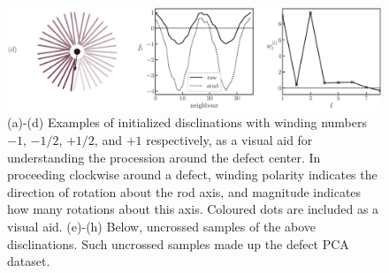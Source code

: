 \begin{figure}[!t]
\begin{minipage}[c]{\columnwidth}
		\includegraphics[width=\columnwidth]{./figs/prob_stats_plusone_small_0.eps}
	\end{minipage}%
	\caption{(a)-(d) Examples of initialized disclinations with winding numbers $-1$, $-1/2$, $+1/2$, and $+1$ respectively, as a visual aid for understanding the procession around the defect center. In proceeding clockwise around a defect, winding polarity indicates the direction of rotation about the rod axis, and magnitude indicates how many rotations about this axis. Coloured dots are included as a visual aid. (e)-(h) Below, uncrossed samples of the above disclinations. Such uncrossed samples made up the defect PCA dataset.
	}
	\label{FIG:prob_samples}
\end{figure}

